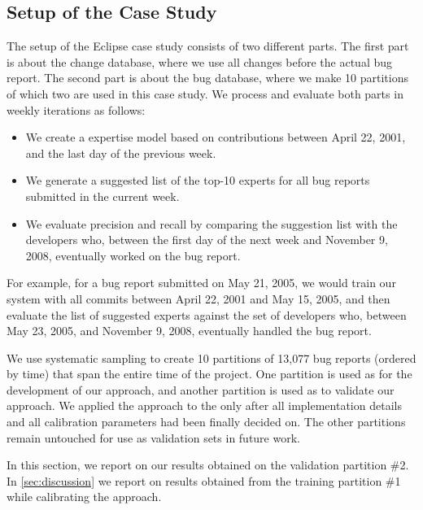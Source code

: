 \subsection{Setup of the Case Study}

The setup of the Eclipse case study consists of two different parts. The first part is about the change database, where we use all changes before the actual bug report. The second part is about the bug database, where we make 10 partitions of which two are used in this case study. We process and evaluate  both parts in weekly iterations as follows:
\begin{itemize}
\item We create a \DEVLECT expertise model based on contributions between April 22, 2001, and the last day of the previous week.
\item We generate a suggested list of the top-10 experts for all bug reports submitted in the current week.
\item We evaluate precision and recall by comparing the suggestion list with the developers who, between the first day of the next week and November 9, 2008, eventually worked on the bug report.
\end{itemize}

For example, for a bug report submitted on May 21, 2005, we would train our system with all commits between April 22, 2001 and May 15, 2005, and then evaluate the list of suggested experts against the set of developers who, between May 23, 2005, and November 9, 2008, eventually handled the bug report.

We use systematic sampling to create 10 partitions of 13,077 bug reports (ordered by time) that span the entire time of the project. One partition is used as \trainingset for the development of our approach, and another partition is used as \validationset to validate our approach. We applied the approach to the \validationset only after all implementation details and all calibration parameters had been finally decided on. The other partitions remain untouched for use as validation sets in future work.

In this section, we report on our results obtained on the validation partition \#2. In \autoref{sec:discussion} we report on results obtained from the training partition \#1 while calibrating the approach.


